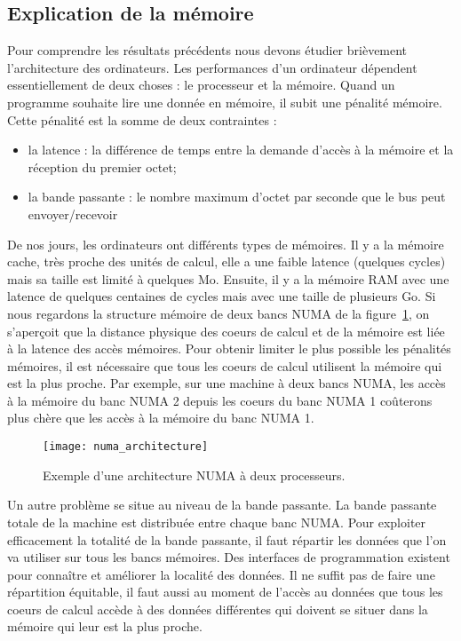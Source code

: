 \subsection{Explication de la mémoire}
Pour comprendre les résultats précédents nous devons étudier brièvement l'architecture des ordinateurs.
%
Les performances d'un ordinateur dépendent essentiellement de deux choses : le processeur et la mémoire.
%
Quand un programme souhaite lire une donnée en mémoire, il subit une pénalité mémoire.
%
Cette pénalité est la somme de deux contraintes :
\begin{itemize}
        \item la latence : la différence de temps entre la demande d'accès à la mémoire et la réception du premier octet;
        \item la bande passante : le nombre maximum d'octet par seconde que le bus peut envoyer/recevoir
\end{itemize}
%
De nos jours, les ordinateurs ont différents types de mémoires.
%
Il y a la mémoire cache, très proche des unités de calcul, elle a une faible latence (quelques cycles) mais sa taille est limité à quelques Mo.
%
Ensuite, il y a la mémoire RAM avec une latence de quelques centaines de cycles mais avec une taille de plusieurs Go.
%
Si nous regardons la structure mémoire de deux bancs NUMA de la figure~\ref{fig:numa_architecture}, on s'aperçoit que la distance physique des coeurs de calcul et de la mémoire est liée à la latence des accès mémoires.
%
Pour obtenir limiter le plus possible les pénalités mémoires, il est nécessaire que tous les coeurs de calcul utilisent la mémoire qui est la plus proche.
%
Par exemple, sur une machine à deux bancs NUMA, les accès à la mémoire du banc NUMA 2 depuis les coeurs du banc NUMA 1 coûterons plus chère que les accès à la mémoire du banc NUMA 1.

\begin{figure}[t!]
  \centering
  \texttt{[image: numa\_architecture]}
  \caption{Exemple d'une architecture NUMA à deux processeurs.}
  \label{fig:numa_architecture}
\end{figure}

Un autre problème se situe au niveau de la bande passante.
%
La bande passante totale de la machine est distribuée entre chaque banc NUMA.
%
Pour exploiter efficacement la totalité de la bande passante, il faut répartir les données que l'on va utiliser sur tous les bancs mémoires.
%
Des interfaces de programmation existent pour connaître et améliorer la localité des données.
%
Il ne suffit pas de faire une répartition équitable, il faut aussi au moment de l'accès au données que tous les coeurs de calcul accède à des données différentes qui doivent se situer dans la mémoire qui leur est la plus proche.
